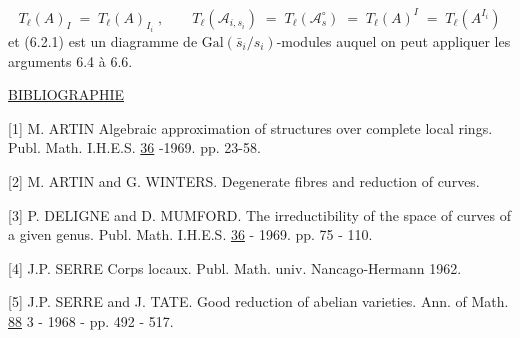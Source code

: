 \begin{equation*}
T_\ell(A)_I \;=\; T_\ell(A)_{I_i} \;,\qquad T_\ell(\mathcal{A}_{i,s_i}) \;=\; T_\ell(\mathcal{A}^\circ_s) \;=\; T_\ell(A)^I \;=\; T_\ell(A^{I_i})
\end{equation*}
et (6.2.1) est un diagramme de  $\mathrm{Gal}(\bar{s}_i/s_i)$-modules auquel on peut appliquer les arguments 6.4 à 6.6.




\underline{BIBLIOGRAPHIE}

[1]	M. ARTIN	Algebraic approximation of structures over complete local rings. Publ. Math. I.H.E.S. \underline{36} -1969. pp. 23-58.

[2]	M. ARTIN and G. WINTERS. Degenerate fibres and reduction of curves.

[3]	P. DELIGNE and D. MUMFORD. The irreductibility of the space of curves of a given genus. Publ. Math. I.H.E.S. \underline{36} - 1969. pp. 75 - 110.

[4]	J.P. SERRE	Corps locaux. Publ. Math. univ. Nancago-Hermann 1962.

[5]	J.P. SERRE and J. TATE. Good reduction of abelian varieties. Ann. of Math. \underline{88} 3 - 1968 - pp. 492 - 517.
